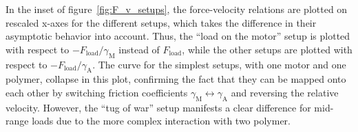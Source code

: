 \documentclass[aps,pre,twocolumn,showpacs,showkeys,superscriptaddress,floatfix]{revtex4-1}
\begin{document}
In the inset of figure~\ref{fig:F_v_setups}, 
the force-velocity relations are plotted on rescaled x-axes for the different setups, 
which takes the difference in their asymptotic behavior into account. 
Thus, the ``load on the motor'' setup is plotted with respect to $ - F_\text{load} / \gamma_\text{M}$ instead of $F_\text{load}$,
while the other setups are plotted with respect to $ - F_\text{load} / \gamma_\text{A}$.
The curve for the simplest setups, with one motor and one polymer, collapse in this plot, 
confirming the fact that they can be mapped onto each other by switching friction coefficients $\gamma_\text{M} \leftrightarrow \gamma_\text{A}$ 
and reversing the relative velocity. 
However, the ``tug of war'' setup manifests a clear difference for mid-range loads due to the more complex interaction with two polymer. 
\end{document}
